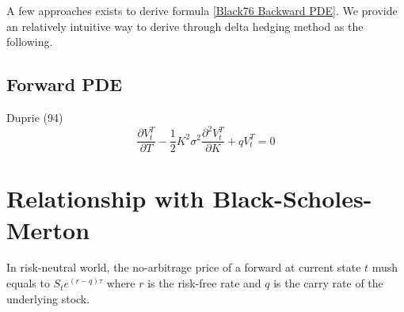 \documentclass{article}
\begin{document}
A few approaches exists to derive formula \ref{Black76 Backward PDE}.
We provide an relatively intuitive way to derive through delta hedging method as the following.

\subsection{Forward PDE}
Duprie (94) 
\begin{equation} \label{Black76 Forward PDE}
    \frac{\partial V_t^T}{\partial T} - \frac{1}{2} K^2 \sigma^2 \frac{\partial^2 V_t^T}{\partial K} + q V_t^T = 0
\end{equation}



\section{Relationship with Black-Scholes-Merton}

In risk-neutral world, the no-arbitrage price of a forward at current state $ t $ mush equals to $ S_t e^{(r - q) \tau} $ where $ r $ is the risk-free rate and $ q $ is the carry rate of the underlying stock. 
\end{document}
